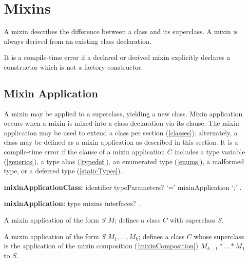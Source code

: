 \documentclass{article}
\newcommand{\code}[1]{{\sf #1}}
\begin{document}

\section{Mixins}


\LMHash{}
A mixin describes the difference between a class and its superclass. A mixin is always derived from an existing class declaration.

\LMHash{}
It is a compile-time error if a declared or derived mixin explicitly declares a constructor which is not a factory constructor.


\subsection{Mixin Application}

\LMHash{}
A mixin may be applied to a superclass, yielding a new class.
Mixin application occurs when a mixin is mixed into a class declaration via its \WITH{} clause.
The mixin application may be used to extend a class per section (\ref{classes}); alternately, a class may be defined as a mixin application as described in this section.
It is a compile-time error if the \WITH{} clause of a mixin application $C$ includes a type variable (\ref{generics}), a type alias (\ref{typedef}), an enumerated type (\ref{enums}), a malformed type, or a deferred type (\ref{staticTypes}).

\begin{grammar}
{\bf  mixinApplicationClass:}
	identifier typeParameters? `='  mixinApplication `{\escapegrammar ;}' .

{\bf mixinApplication:}
     type mixins interfaces?
    .
\end{grammar}

\LMHash{}
A  mixin application of the form  \code{$S$ \WITH{} $M$;} defines a class  $C$ with superclass  $S$.

\LMHash{}
A  mixin application of the form  \code{$S$ \WITH{} $M_1, \ldots, M_k$;} defines a class  $C$ whose superclass is the application of the mixin composition (\ref{mixinComposition}) $M_{k-1} * \ldots * M_1$ to $S$.
\end{document}
